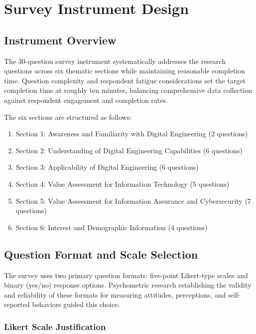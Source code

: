 \section{Survey Instrument Design}

\subsection{Instrument Overview}

The 30-question survey instrument systematically addresses the research questions across six thematic sections while maintaining reasonable completion time. Question complexity and respondent fatigue considerations set the target completion time at roughly ten minutes, balancing comprehensive data collection against respondent engagement and completion rates.

The six sections are structured as follows:

\begin{enumerate}
  \item Section 1: Awareness and Familiarity with Digital Engineering (2 questions)
  \item Section 2: Understanding of Digital Engineering Capabilities (6 questions)
  \item Section 3: Applicability of Digital Engineering (6 questions)
  \item Section 4: Value Assessment for Information Technology (5 questions)
  \item Section 5: Value Assessment for Information Assurance and Cybersecurity (7 questions)
  \item Section 6: Interest and Demographic Information (4 questions)
\end{enumerate}

\subsection{Question Format and Scale Selection}

The survey uses two primary question formats: five-point Likert-type scales and binary (yes/no) response options. Psychometric research establishing the validity and reliability of these formats for measuring attitudes, perceptions, and self-reported behaviors guided this choice.

\subsubsection{Likert Scale Justification}

